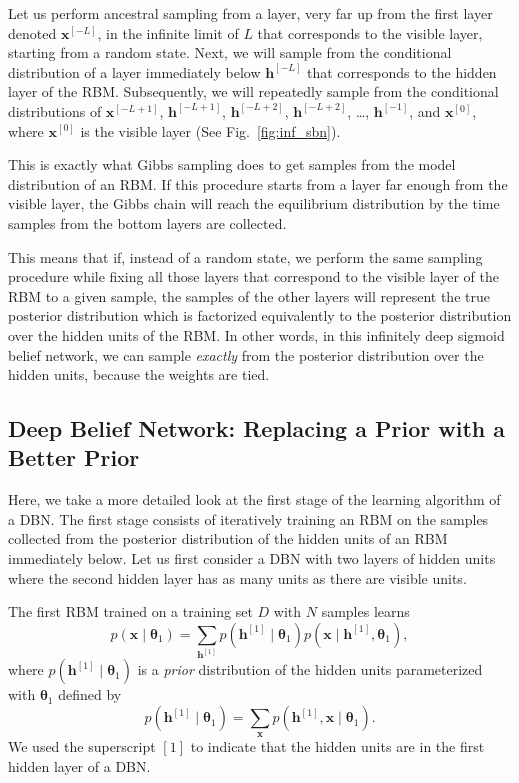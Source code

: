 \documentclass[dissertation,nocontribution]{aaltoseries}
\newcommand{\qlay}[1]{\left[#1\right]}
\newcommand{\vect}[1]{\mathbf{#1}}
\newcommand{\vects}[1]{\boldsymbol{#1}}
\newcommand{\vh}[0]{\vect{h}}
\newcommand{\vx}[0]{\vect{x}}
\newcommand{\TT}[0]{{\vects{\theta}}}
\begin{document}
Let us perform ancestral sampling from a layer, very far up
from the first layer denoted $\vx^{\qlay{-L}}$, in the infinite
limit of $L$ that corresponds
to the visible layer, starting from a random state.  Next,
we will sample from the conditional distribution of a layer
immediately below $\vh^{\qlay{-L}}$ that corresponds to the
hidden layer of the RBM. Subsequently, we will repeatedly
sample from the conditional distributions of $\vx^{\qlay{-L+1}}$,
$\vh^{\qlay{-L+1}}$, $\vh^{\qlay{-L+2}}$, $\vh^{\qlay{-L+2}}$, \dots,
$\vh^{\qlay{-1}}$, and $\vx^{\qlay{0}}$, where $\vx^{\qlay{0}}$ is the
visible layer (See Fig.~\ref{fig:inf_sbn}). 

This is exactly what Gibbs sampling
does to get samples from the model distribution of an RBM.
If this procedure starts from a layer far enough from the
visible layer, the Gibbs chain will reach the equilibrium
distribution by the time samples from the bottom layers are
collected. 

This means that if, instead of a random state, we perform
the same sampling procedure while fixing all those layers
that correspond to the visible layer of the RBM to a given
sample, the samples of the other layers will represent the
true posterior distribution which is factorized equivalently
to the posterior distribution over the hidden units of the
RBM. In other words, in this infinitely deep sigmoid belief
network, we can sample \textit{exactly} from the posterior
distribution over the hidden units, because the weights are
tied.

\subsection{Deep Belief Network: Replacing a Prior with a
Better Prior}
\label{sec:dbn_rbm}

Here, we take a more detailed look at the first stage of the
learning algorithm of a DBN.
The first stage consists of
iteratively training an RBM on the samples collected from
the posterior distribution of the hidden units of an RBM
immediately below. Let us first consider a DBN with two
layers of hidden units where the second hidden layer has
as many units as there are visible units.

The first RBM trained on a training set $D$ with $N$ samples
learns
\[
p(\vx \mid \TT_1) = \sum_{\vh^{\qlay{1}}} p(\vh^{\qlay{1}}\mid \TT_1) p(\vx \mid
\vh^{\qlay{1}}, \TT_1),
\]
where $p(\vh^{\qlay{1}}\mid \TT_1)$ is a \textit{prior} distribution
of the hidden units parameterized with $\TT_1$ defined by
\[
p(\vh^{\qlay{1}} \mid \TT_1) = \sum_{\vx} p(\vh^{\qlay{1}}, \vx \mid \TT_1).
\]
We used the superscript $\qlay{1}$ to indicate that the hidden
units are in the first hidden layer of a DBN.
\end{document}
